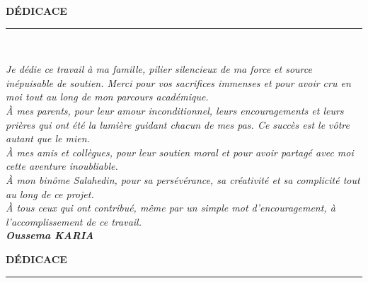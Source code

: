 \documentclass[a4paper,12pt]{report}
\begin{document}
	\clearpage
	\thispagestyle{preStyle}
	
	\null\vspace*{\fill}
	\begin{center}
		{\fontsize{26}{30}\selectfont\bfseries DÉDICACE}\\[1cm]
		\rule{0.5\textwidth}{0.5pt}\\[1.5cm]
	\end{center}
	
	\begin{flushright}
		\itshape
		Je dédie ce travail à ma famille, pilier silencieux de ma force et source inépuisable de soutien. Merci pour vos sacrifices immenses et pour avoir cru en moi tout au long de mon parcours académique.\\[0.5cm]
		
		À mes parents, pour leur amour inconditionnel, leurs encouragements et leurs prières qui ont été la lumière guidant chacun de mes pas. Ce succès est le vôtre autant que le mien.\\[0.5cm]
		
		À mes amis et collègues, pour leur soutien moral et pour avoir partagé avec moi cette aventure inoubliable.\\[0.5cm]
		
		À mon binôme Salahedin, pour sa persévérance, sa créativité et sa complicité tout au long de ce projet.\\[0.5cm]
		
		À tous ceux qui ont contribué, même par un simple mot d'encouragement, à l'accomplissement de ce travail.\\[0.8cm]
		
		\textbf{\Large Oussema KARIA}
	\end{flushright}
	
	\vspace*{\fill}
	
	\clearpage
	\thispagestyle{preStyle}
	
	\null\vspace*{\fill}
	\begin{center}
		{\fontsize{26}{30}\selectfont\bfseries DÉDICACE}\\[1cm]
		\rule{0.5\textwidth}{0.5pt}\\[1.5cm]
	\end{center}
	
\end{document}
